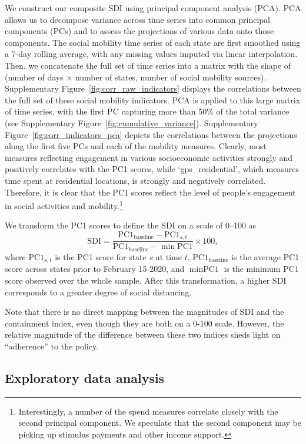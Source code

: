 \documentclass[dvipsnames]{article}
\begin{document}
We construct our composite SDI using principal component analysis (PCA). PCA allows us to decompose variance across time series into common principal components (PCs) and to assess the projections of various data onto those components. The social mobility time series of each state are first smoothed using a 7-day rolling average, with any missing values imputed via linear interpolation. Then, we concatenate the full set of time series into a matrix with the shape of (number of days $\times$ number of states, number of social mobility sources). Supplementary Figure~\ref{fig:corr_raw_indicators} displays the correlations between the full set of these social mobility indicators. PCA is applied to this large matrix of time series, with the first PC capturing more than 50\% of the total variance (see Supplementary Figure~\ref{fig:cumulative_variance}). Supplementary Figure~\ref{fig:corr_indicators_pca} depicts the correlations between the projections along the first five PCs and each of the mobility measures. Clearly, most measures reflecting engagement in various socioeconomic activities strongly and positively correlates with the PC1 scores, while `gps\_residential', which measures time spent at residential locations, is strongly and negatively correlated. Therefore, it is clear that the PC1 scores reflect the level of people's engagement in social activities and mobility.\footnote{Interestingly, a number of the spend measures correlate closely with the second principal component. We speculate that the second component may be picking up stimulus payments and other income support.} 

We transform the PC1 scores to define the SDI on a scale of 0--100 as
\[\text{SDI} = \frac{\text{PC1}_{\text{baseline}} - \text{PC1}_{s,t}}{\text{PC1}_{\text{baseline}} - \min\text{PC1}} \times 100 ,
\]
where $\text{PC1}_{s,t}$ is the PC1 score for state $s$ at time $t$, $\text{PC1}_{\text{baseline}}$ is the average PC1 score across states prior to February 15 2020, and $\min \text{PC1}$ is the minimum PC1 score observed over the whole sample. After this transformation, a higher SDI corresponds to a greater degree of social distancing. 

Note that there is no direct mapping between the magnitudes of SDI and the containment index, even though they are both on a 0-100 scale. However, the relative magnitude of the difference between these two indices sheds light on ``adherence'' to the policy.

\subsection{Exploratory data analysis}
\end{document}
